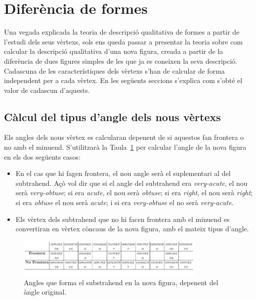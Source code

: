 \documentclass{article}
\begin{document}
\section{Diferència de formes}
Una vegada explicada la teoria de descripció qualitativa de formes a partir de l'estudi dels seus vèrtexs, sols ens queda passar a presentar la teoria sobre com calcular la descripció qualitativa d'una nova figura, creada a partir de la  diferència de dues figures simples de les que ja es coneixen la seva descripció.
Cadascuna de les característiques dels vèrtexs s'han de calcular de forma independent per a cada vèrtex.
En les següents seccions s'explica com s'obté el valor de cadascun d'aquests.

\subsection{Càlcul del tipus d'angle dels nous vèrtexs}
Els angles dels nous vèrtex es calcularan depenent de si aquestos fan frontera o no amb el minuend.
S’utilitzarà la Taula~\ref{fig:taula1} per calcular l’angle de la nova figura en els dos següents casos:

\begin{itemize}
\item En el cas que hi fagen frontera, el nou angle serà el suplementari al del subtrahend.
      Açò vol dir que si el angle del subtrahend era \emph{very-acute}, el nou serà \emph{very-obtuse};
      si era \emph{acute}, el nou serà \emph{obtuse};
      si era \emph{right}, el nou serà \emph{right};
      si era \emph{obtuse} el nou serà \emph{acute};
      i si era \emph{very-obtuse} el no serà \emph{very-acute}.

\item Els vèrtex dels subtrahend que no hi facen frontera amb el minuend es convertiran en vèrtex còncaus de la nova figura, amb el mateix tipus d’angle.
\end{itemize}

\begin{figure}[h]
\centering
\includegraphics[width=260pt]{images/taula1.jpeg}
\caption {Angles que forma el substrahend en la nova figura, depenent del àngle original.}
\label {fig:taula1}
\end{figure}
\end{document}
